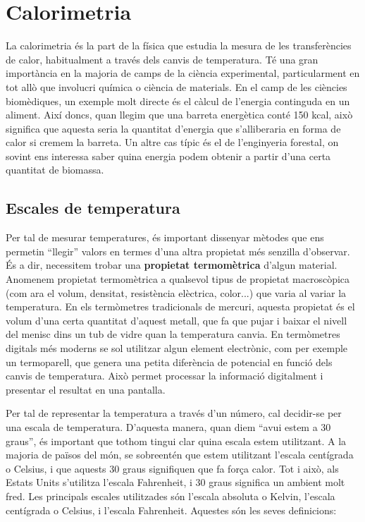 \documentclass[12pt]{book}
\begin{document}
\section{Calorimetria}

La calorimetria és la part de la física que estudia la mesura de les transferències de calor, habitualment a través dels canvis de temperatura. Té una gran importància en la majoria de camps de la ciència experimental, particularment en tot allò que involucri química o ciència de materials. En el camp de les ciències biomèdiques, un exemple molt directe és el càlcul de l'energia continguda en un aliment. Així doncs, quan llegim que una barreta energètica conté 150 kcal,  això significa que aquesta seria la quantitat d'energia que s'alliberaria en forma de calor si cremem la barreta. Un altre cas típic és el de l'enginyeria forestal, on sovint ens interessa saber quina energia podem obtenir a partir d'una certa quantitat de biomassa. 

\subsection{Escales de temperatura}

Per tal de mesurar temperatures, és important dissenyar mètodes que ens permetin ``llegir'' valors en termes d'una altra propietat més senzilla d'observar. És a dir, necessitem trobar una {\bf propietat termomètrica} d'algun material. Anomenem propietat termomètrica a qualsevol tipus de propietat macroscòpica (com ara el volum, densitat, resistència elèctrica, color...) que varia al variar la temperatura. En els termòmetres tradicionals de mercuri, aquesta propietat és el volum d'una certa quantitat d'aquest metall, que fa que pujar i baixar el nivell del menisc dins un tub de vidre quan la temperatura canvia. En termòmetres digitals més moderns se sol utilitzar algun element electrònic, com per exemple un termoparell, que genera una petita diferència de potencial en funció dels canvis de temperatura. Això permet processar la informació digitalment i presentar el resultat en una pantalla.

Per tal de representar la temperatura a través d'un número, cal decidir-se per una escala de temperatura. D'aquesta manera, quan diem ``avui estem a 30 graus'', és important que tothom tingui clar quina escala estem utilitzant. A la majoria de països del món, se sobreentén que estem utilitzant l'escala centígrada o Celsius, i que aquests 30 graus signifiquen que fa força calor. Tot i això, als Estats Units s'utilitza l'escala Fahrenheit, i 30 graus significa un ambient molt fred. Les principals escales utilitzades són l'escala absoluta o Kelvin, l'escala centígrada o Celsius, i l'escala Fahrenheit. Aquestes són les seves definicions:
\end{document}
